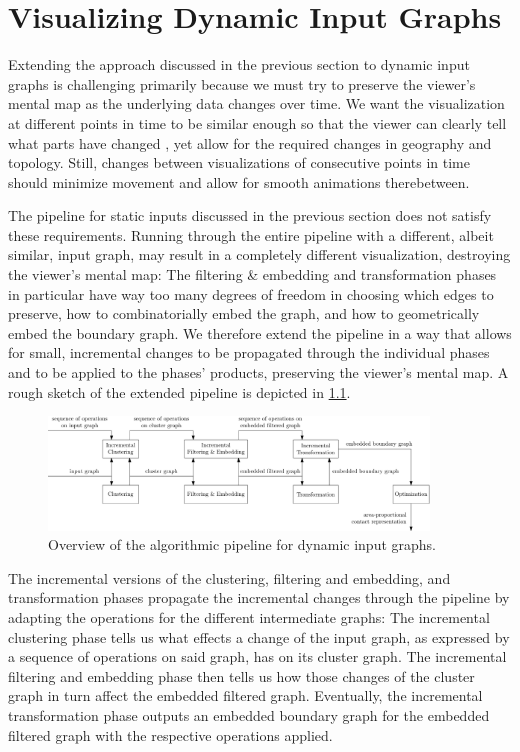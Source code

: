 \chapter{Visualizing Dynamic Input Graphs}
\label{chap:visualizing-dynamic-input-graphs}

Extending the approach discussed in the previous section to dynamic input graphs is challenging primarily because we must try to preserve the viewer's mental map as the underlying data changes over time. We want the visualization at different points in time to be similar enough so that the viewer can clearly tell what parts have changed \cite{mashima2011visualizing}, yet allow for the required changes in geography and topology. Still, changes between visualizations of consecutive points in time should minimize movement and allow for smooth animations therebetween.

The pipeline for static inputs discussed in the previous section does not satisfy these requirements. Running through the entire pipeline with a different, albeit similar, input graph, may result in a completely different visualization, destroying the viewer's mental map: The filtering \& embedding and transformation phases in particular have way too many degrees of freedom in choosing which edges to preserve, how to combinatorially embed the graph, and how to geometrically embed the boundary graph. We therefore extend the pipeline in a way that allows for small, incremental changes to be propagated through the individual phases and to be applied to the phases' products, preserving the viewer's mental map. A rough sketch of the extended pipeline is depicted in \cref{fig:dynamic-pipeline}.

\begin{figure}[H]
	\centering\includegraphics[width=0.9\textwidth]{Resources/DynamicPipeline.pdf}
	\caption{Overview of the algorithmic pipeline for dynamic input graphs.}
	\label{fig:dynamic-pipeline}
\end{figure}

The incremental versions of the clustering, filtering and embedding, and transformation phases propagate the incremental changes through the pipeline by adapting the operations for the different intermediate graphs: The incremental clustering phase tells us what effects a change of the input graph, as expressed by a sequence of operations on said graph, has on its cluster graph. The incremental filtering and embedding phase then tells us how those changes of the cluster graph in turn affect the embedded filtered graph. Eventually, the incremental transformation phase outputs an embedded boundary graph for the embedded filtered graph with the respective operations applied.

